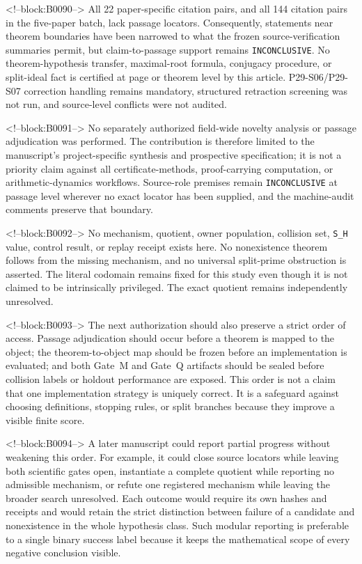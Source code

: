 \documentclass[11pt,a4paper]{article}
\begin{document}
<!--block:B0090-->
All 22 paper-specific citation pairs, and all 144 citation pairs in the five-paper batch, lack passage locators. Consequently, statements near theorem boundaries have been narrowed to what the frozen source-verification summaries permit, but claim-to-passage support remains \texttt{INCONCLUSIVE}. No theorem-hypothesis transfer, maximal-root formula, conjugacy procedure, or split-ideal fact is certified at page or theorem level by this article. P29-S06/P29-S07 correction handling remains mandatory, structured retraction screening was not run, and source-level conflicts were not audited.

<!--block:B0091-->
No separately authorized field-wide novelty analysis or passage adjudication was performed. The contribution is therefore limited to the manuscript's project-specific synthesis and prospective specification; it is not a priority claim against all certificate-methods, proof-carrying computation, or arithmetic-dynamics workflows. Source-role premises remain \texttt{INCONCLUSIVE} at passage level wherever no exact locator has been supplied, and the machine-audit comments preserve that boundary.

<!--block:B0092-->
No mechanism, quotient, owner population, collision set, \texttt{S\_H} value, control result, or replay receipt exists here. No nonexistence theorem follows from the missing mechanism, and no universal split-prime obstruction is asserted. The literal codomain remains fixed for this study even though it is not claimed to be intrinsically privileged. The exact quotient remains independently unresolved.

<!--block:B0093-->
The next authorization should also preserve a strict order of access. Passage adjudication should occur before a theorem is mapped to the object; the theorem-to-object map should be frozen before an implementation is evaluated; and both Gate~M and Gate~Q artifacts should be sealed before collision labels or holdout performance are exposed. This order is not a claim that one implementation strategy is uniquely correct. It is a safeguard against choosing definitions, stopping rules, or split branches because they improve a visible finite score.

<!--block:B0094-->
A later manuscript could report partial progress without weakening this order. For example, it could close source locators while leaving both scientific gates open, instantiate a complete quotient while reporting no admissible mechanism, or refute one registered mechanism while leaving the broader search unresolved. Each outcome would require its own hashes and receipts and would retain the strict distinction between failure of a candidate and nonexistence in the whole hypothesis class. Such modular reporting is preferable to a single binary success label because it keeps the mathematical scope of every negative conclusion visible.
\end{document}
